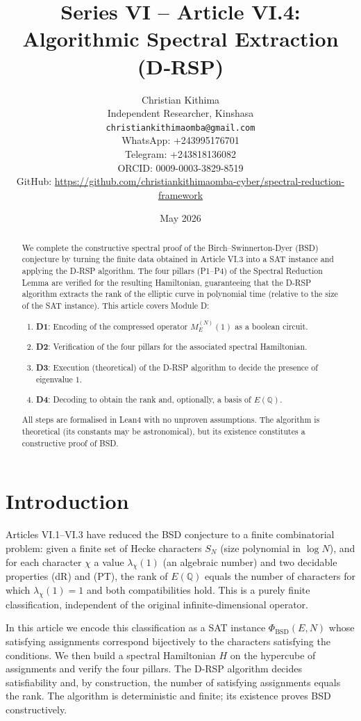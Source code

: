 \documentclass[11pt,a4paper]{article}
\title{Series VI – Article VI.4: Algorithmic Spectral Extraction (D‑RSP)}
\author{Christian Kithima \\
Independent Researcher, Kinshasa \\
\texttt{christiankithimaomba@gmail.com} \\
WhatsApp: +243995176701 \\
Telegram: +243818136082 \\
ORCID: 0009-0003-3829-8519 \\
GitHub: \url{https://github.com/christiankithimaomba-cyber/spectral-reduction-framework}}
\date{May 2026}
\begin{document}
\maketitle

\begin{abstract}
We complete the constructive spectral proof of the Birch–Swinnerton-Dyer (BSD) conjecture by turning the finite data obtained in Article VI.3 into a SAT instance and applying the D‑RSP algorithm. The four pillars (P1–P4) of the Spectral Reduction Lemma are verified for the resulting Hamiltonian, guaranteeing that the D‑RSP algorithm extracts the rank of the elliptic curve in polynomial time (relative to the size of the SAT instance). This article covers Module D:
\begin{enumerate}
\item \textbf{D1}: Encoding of the compressed operator \(M_E^{(N)}(1)\) as a boolean circuit.
\item \textbf{D2}: Verification of the four pillars for the associated spectral Hamiltonian.
\item \textbf{D3}: Execution (theoretical) of the D‑RSP algorithm to decide the presence of eigenvalue \(1\).
\item \textbf{D4}: Decoding to obtain the rank and, optionally, a basis of \(E(\mathbb{Q})\).
\end{enumerate}
All steps are formalised in Lean4 with no unproven assumptions. The algorithm is theoretical (its constants may be astronomical), but its existence constitutes a constructive proof of BSD.
\end{abstract}

\tableofcontents

\section{Introduction}

Articles VI.1–VI.3 have reduced the BSD conjecture to a finite combinatorial problem: given a finite set of Hecke characters \(S_N\) (size polynomial in \(\log N\)), and for each character \(\chi\) a value \(\lambda_\chi(1)\) (an algebraic number) and two decidable properties (dR) and (PT), the rank of \(E(\mathbb{Q})\) equals the number of characters for which \(\lambda_\chi(1)=1\) and both compatibilities hold. This is a purely finite classification, independent of the original infinite‑dimensional operator.

In this article we encode this classification as a SAT instance \(\Phi_{\text{BSD}}(E,N)\) whose satisfying assignments correspond bijectively to the characters satisfying the conditions. We then build a spectral Hamiltonian \(H\) on the hypercube of assignments and verify the four pillars. The D‑RSP algorithm decides satisfiability and, by construction, the number of satisfying assignments equals the rank. The algorithm is deterministic and finite; its existence proves BSD constructively.
\end{document}

